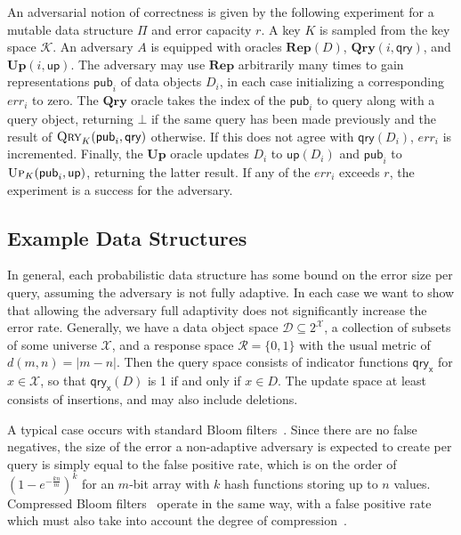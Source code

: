 An adversarial notion of correctness is given by the following experiment for a mutable data structure $\Pi$ and error capacity $r$. A key $K$ is sampled from the key space $\mathcal{K}$. An adversary $A$ is equipped with oracles $\mathbf{Rep}(D)$, $\mathbf{Qry}(i,\mathsf{qry})$, and $\mathbf{Up}(i,\mathsf{up})$. The adversary may use $\mathbf{Rep}$ arbitrarily many times to gain representations $\mathsf{pub}_i$ of data objects $D_i$, in each case initializing a corresponding $err_i$ to zero. The $\mathbf{Qry}$ oracle takes the index of the $\mathsf{pub}_i$ to query along with a query object, returning $\bot$ if the same query has been made previously and the result of $\textsc{Qry}_K(\mathsf{pub}_i,\mathsf{qry})$ otherwise. If this does not agree with $\mathsf{qry}(D_i)$, $err_i$ is incremented. Finally, the $\mathbf{Up}$ oracle updates $D_i$ to $\mathsf{up}(D_i)$ and $\mathsf{pub}_i$ to $\textsc{Up}_K(\mathsf{pub}_i,\mathsf{up})$, returning the latter result. If any of the $err_i$ exceeds $r$, the experiment is a success for the adversary.

\subsection{Example Data Structures}

In general, each probabilistic data structure has some bound on the error size per query, assuming the adversary is not fully adaptive. In each case we want to show that allowing the adversary full adaptivity does not significantly increase the error rate. Generally, we have a data object space $\mathcal{D} \subseteq 2^\mathcal{X}$, a collection of subsets of some universe $\mathcal{X}$, and a response space $\mathcal{R} = \{0,1\}$ with the usual metric of $d(m,n) = |m-n|$. Then the query space consists of indicator functions $\mathsf{qry_x}$ for $x \in \mathcal{X}$, so that $\mathsf{qry_x}(D)$ is 1 if and only if $x \in D$. The update space at least consists of insertions, and may also include deletions.

A typical case occurs with standard Bloom filters~\cite{bloomfilter}. Since there are no false negatives, the size of the error a non-adaptive adversary is expected to create per query is simply equal to the false positive rate, which is on the order of $(1-e^{-\frac{kn}{m}})^k$ for an $m$-bit array with $k$ hash functions storing up to $n$ values. Compressed Bloom filters~\cite{xxx} operate in the same way, with a false positive rate which must also take into account the degree of compression~. 

